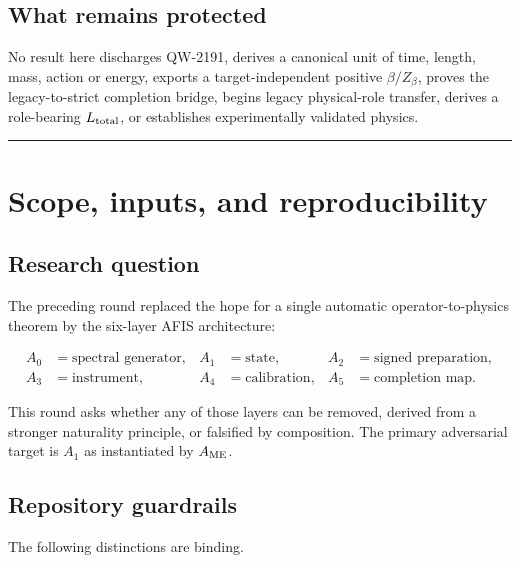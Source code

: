 \documentclass[11pt,a4paper,openany]{report}
\begin{document}
\section{What remains protected}

No result here discharges QW-2191, derives a canonical unit of time, length, mass, action or energy, exports a target-independent positive \(\beta/Z_\beta\), proves the legacy-to-strict completion bridge, begins legacy physical-role transfer, derives a role-bearing \(L_{\rm total}\), or establishes experimentally validated physics.

\par\medskip\hrule\medskip

\chapter{Scope, inputs, and reproducibility}

\section{Research question}

The preceding round replaced the hope for a single automatic operator-to-physics theorem by the six-layer AFIS architecture:

\[
\begin{aligned}
A_0&=\text{spectral generator},&
A_1&=\text{state},&
A_2&=\text{signed preparation},\\
A_3&=\text{instrument},&
A_4&=\text{calibration},&
A_5&=\text{completion map}.
\end{aligned}
\]

This round asks whether any of those layers can be removed, derived from a stronger naturality principle, or falsified by composition. The primary adversarial target is \(A_1\) as instantiated by \(A_{\rm ME}\).

\section{Repository guardrails}

The following distinctions are binding.
\end{document}
